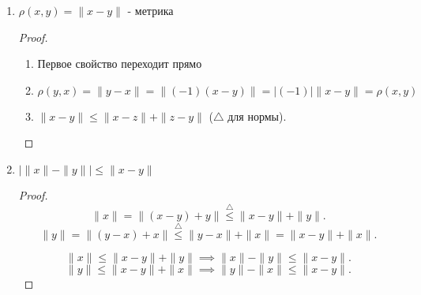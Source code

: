 \begin{properties} \thmslashn

    \begin{enumerate}
        \item $\rho(x, y) = \|x - y\|$ - метрика
            \begin{proof} \thmslashn
            
                \begin{enumerate}
                    \item Первое свойство переходит прямо
                    \item $\rho(y, x) = \|y - x\| = \|(-1)(x - y)\| = |(-1)|\|x - y\| = \rho(x, y)$ 
                    \item $\|x - y\| \le \|x - z\| + \|z - y\|$ ($\triangle$ для нормы). 
                \end{enumerate}
            \end{proof}
        \item $| \|x\| - \|y\| | \le \|x - y\|$ 
            \begin{proof} \thmslashn
            
                \[ \|x\| = \|(x - y) + y\| \overset{\triangle}{\le} \|x - y\| + \|y\| .\] 
                \[ \|y\| = \|(y - x) + x\| \overset{\triangle}{\le} \|y - x\| + \|x\| = \|x - y\| + \|x\| .\]

                \[ \|x\| \le \|x - y\| + \|y\| \implies \|x\| - \|y\| \le \|x - y\| .\]
                \[ \|y\| \le \|x - y\| + \|x\| \implies \|y\| - \|x\| \le \|x - y\| .\]
            \end{proof}
    \end{enumerate}
\end{properties}
